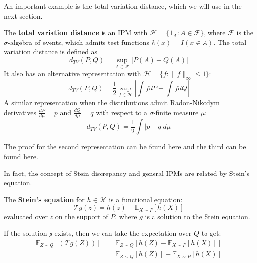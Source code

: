 \documentclass{article}
\begin{document}
An important example is the total variation distance, which we will use in the next section.  

\begin{example}
    The \textbf{total variation distance} is an IPM with $\mathcal{H}=\{1_A: A \in \mathcal{F}\}$, where $\mathcal{F}$ is the $\sigma$-algebra of events, which admits test functions $h(x) = I(x\in A)$. The total variation distance is defined as  
    \begin{equation}
        d_{TV}(P, Q) = \sup_{A \in \mathcal{F}} |P(A) - Q(A)|
        \label{eq:total_variation_distance}
    \end{equation}
    It also has an alternative representation with $\mathcal{H} = \{f: \|f\|_\infty \leq 1\}$:
    \begin{equation*}
        d_{TV}(P, Q) = \frac{1}{2} \sup_{f \in \mathcal{H}}\left|\int f dP - \int f dQ\right|
    \end{equation*}
    A similar representation when the distributions admit Radon-Nikodym derivatives $\frac{dP}{d\mu}=p$ and $\frac{dQ}{d\mu}=q$ with respect to a $\sigma$-finite measure $\mu$:
    \begin{equation*}
        d_{TV}(P, Q) = \frac{1}{2} \int |p - q| d\mu
    \end{equation*}
\end{example}

The proof for the second representation can be found \href{https://math.stackexchange.com/questions/3287889/show-that-the-total-variation-distance-of-probability-measures-mu-nu-is-equa}{here} and the third can be found \href{https://math.stackexchange.com/questions/1481101/definition-of-the-total-variation-distance-vp-q-frac12-int-p-qd-n}{here}.  

In fact, the concept of Stein discrepancy and general IPMs are related by Stein's equation.

\begin{definition}\label{def:stein_equation}
    The \textbf{Stein's equation} for $h\in \mathcal{H}$ is a functional equation:
    \begin{equation*}
        \mathcal{T}g (z) = h(z) - \mathbb{E}_{X\sim P}[h(X)]
    \end{equation*}
    evaluated over $z$ on the support of $P$, where $g$ is a solution to the Stein equation.
\end{definition}

If the solution $g$ exists, then we can take the expectation over $Q$ to get:
\begin{align*}
    \mathbb{E}_{Z\sim Q}[(\mathcal{T}g(Z))] &= \mathbb{E}_{Z\sim Q}[h(Z) - \mathbb{E}_{X\sim P}[h(X)]]\\
    &= \mathbb{E}_{Z\sim Q}[h(Z)] - \mathbb{E}_{X\sim P}[h(X)]\\
\end{align*}
\end{document}
